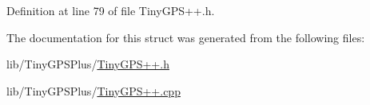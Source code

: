 Definition at line 79 of file Tiny\+G\+P\+S++.\+h.



The documentation for this struct was generated from the following files\+:\begin{DoxyCompactItemize}
\item 
lib/\+Tiny\+G\+P\+S\+Plus/\hyperlink{_tiny_g_p_s_09_09_8h}{Tiny\+G\+P\+S++.\+h}\item 
lib/\+Tiny\+G\+P\+S\+Plus/\hyperlink{_tiny_g_p_s_09_09_8cpp}{Tiny\+G\+P\+S++.\+cpp}\end{DoxyCompactItemize}
